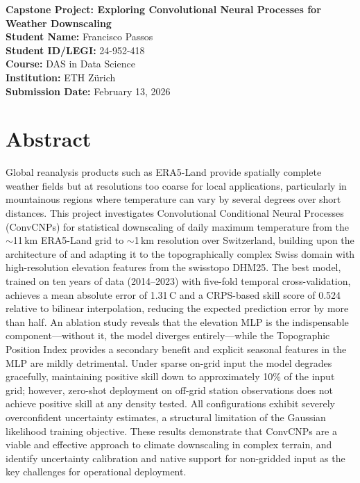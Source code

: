 
\begin{titlepage}
    \centering
    \vspace*{1cm}
    \Huge \textbf{Capstone Project: Exploring Convolutional Neural Processes for Weather Downscaling} \\
    \vspace{1.5cm}
    \Large \textbf{Student Name:} Francisco Passos \\
    \Large \textbf{Student ID/LEGI:} 24-952-418 \\
    \vspace{1cm}
    \large \textbf{Course:} DAS in Data Science \\
    \large \textbf{Institution:} ETH Zürich \\
    \vspace{2cm}
    \large \textbf{Submission Date:} February 13, 2026
\end{titlepage}

\section*{Abstract}

Global reanalysis products such as ERA5-Land provide spatially complete weather fields but at resolutions too coarse for local applications, particularly in mountainous regions where temperature can vary by several degrees over short distances. This project investigates Convolutional Conditional Neural Processes (ConvCNPs) for statistical downscaling of daily maximum temperature from the ${\sim}$11\,km ERA5-Land grid to ${\sim}$1\,km resolution over Switzerland, building upon the architecture of \citet{vaughan2022} and adapting it to the topographically complex Swiss domain with high-resolution elevation features from the swisstopo DHM25. The best model, trained on ten years of data (2014--2023) with five-fold temporal cross-validation, achieves a mean absolute error of 1.31\,\textdegree C and a CRPS-based skill score of 0.524 relative to bilinear interpolation, reducing the expected prediction error by more than half. An ablation study reveals that the elevation MLP is the indispensable component---without it, the model diverges entirely---while the Topographic Position Index provides a secondary benefit and explicit seasonal features in the MLP are mildly detrimental. Under sparse on-grid input the model degrades gracefully, maintaining positive skill down to approximately 10\% of the input grid; however, zero-shot deployment on off-grid station observations does not achieve positive skill at any density tested. All configurations exhibit severely overconfident uncertainty estimates, a structural limitation of the Gaussian likelihood training objective. These results demonstrate that ConvCNPs are a viable and effective approach to climate downscaling in complex terrain, and identify uncertainty calibration and native support for non-gridded input as the key challenges for operational deployment.

